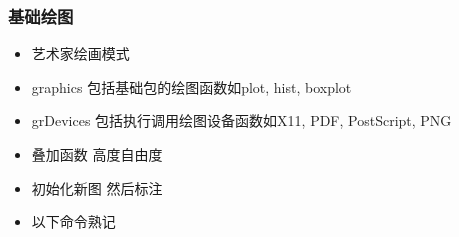 \documentclass[
]{book}
\providecommand{\tightlist}{%
  \setlength{\itemsep}{0pt}\setlength{\parskip}{0pt}}
\begin{document}
\hypertarget{ux57faux7840ux7ed8ux56fe}{%
\subsubsection{基础绘图}\label{ux57faux7840ux7ed8ux56fe}}

\begin{itemize}
\tightlist
\item
  艺术家绘画模式
\item
  graphics 包括基础包的绘图函数如plot, hist, boxplot
\item
  grDevices 包括执行调用绘图设备函数如X11, PDF, PostScript, PNG
\item
  叠加函数 高度自由度
\item
  初始化新图 然后标注
\item
  以下命令熟记


\end{itemize}
\end{document}
